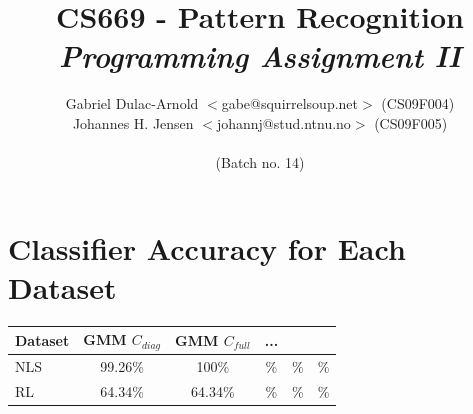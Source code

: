 \documentclass[a4paper]{article}
\author{Gabriel Dulac-Arnold $<$gabe@squirrelsoup.net$>$ (CS09F004) \\
Johannes H. Jensen $<$johannj@stud.ntnu.no$>$ (CS09F005) \\
\\
(Batch no. 14)}
\title{CS669 - Pattern Recognition\\
\emph{Programming Assignment II}}
\begin{document}
\setlength{\parskip}{2ex}
\maketitle

\section{Classifier Accuracy for Each Dataset}

\begin{tabular}{ l | c | c | c | c | c | }
Dataset & GMM $C_{diag}$ & GMM $C_{full}$ & ...\\
\hline
  NLS & 99.26\% & 100\% & \% & \% & \% \\
\hline
  RL & 64.34\% & 64.34\% & \% & \% & \% \\
\hline
\end{tabular}
\end{document}
